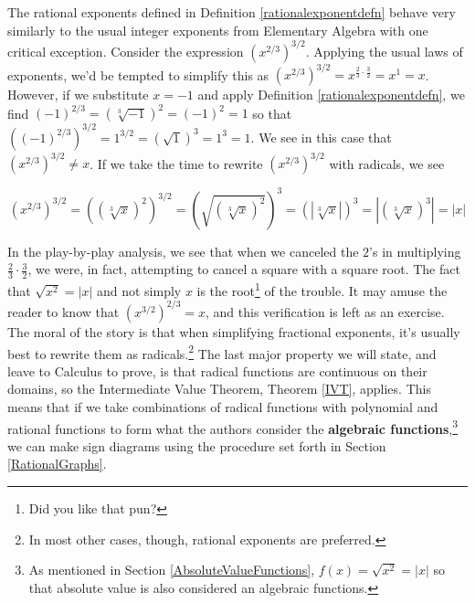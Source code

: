 \documentclass[12pt]{ximera}
\begin{document}

\smallskip

The rational exponents defined in Definition \ref{rationalexponentdefn} behave very similarly to the usual integer exponents from Elementary Algebra with one critical exception.  Consider the expression $\left(x^{2/3}\right)^{3/2}$.  Applying the usual laws of exponents, we'd be tempted to simplify this as $\left(x^{2/3}\right)^{3/2} = x^{\frac{2}{3} \cdot \frac{3}{2}} = x^{1} = x$.  However, if we substitute $x=-1$ and apply Definition \ref{rationalexponentdefn}, we find $(-1)^{2/3} = \left(\sqrt[3]{-1}\right)^2 = (-1)^2 = 1$ so that $\left((-1)^{2/3}\right)^{3/2} = 1^{3/2} = \left(\sqrt{1}\right)^3 = 1^3 = 1$.  We see in this case that $\left(x^{2/3}\right)^{3/2} \neq x$.  If we take the time to rewrite $\left(x^{2/3}\right)^{3/2}$ with radicals, we see 

\[ \left(x^{2/3}\right)^{3/2} = \left(\left(\sqrt[3]{x}\right)^2\right)^{3/2} =  \left(\sqrt{\left(\sqrt[3]{x}\right)^2}\right)^3 =\left(\left|\sqrt[3]{x}\right|\right)^3 = \left| \left(\sqrt[3]{x}\right)^3  \right| = |x|\]

In the play-by-play analysis, we see that when we canceled the $2$'s in multiplying $\frac{2}{3} \cdot \frac{3}{2}$, we were, in fact, attempting to cancel a square with a square root.  The fact that $\sqrt{x^2} = |x|$ and not simply $x$ is the root\footnote{Did you like that pun?} of the trouble.  It may amuse the reader to know that  $\left(x^{3/2}\right)^{2/3} = x$, and this verification is left as an exercise.  The moral of the story is that when simplifying fractional exponents, it's usually best to rewrite them as radicals.\footnote{In most other cases, though, rational exponents are preferred.}   The last major property we will state, and leave to Calculus to prove, is that radical functions are continuous on their domains, so the Intermediate Value Theorem, Theorem \ref{IVT}, applies.  This means that if we take combinations of radical functions with polynomial and rational functions to form what the authors consider  the \textbf{algebraic functions},\footnote{As mentioned in Section \ref{AbsoluteValueFunctions}, $f(x) = \sqrt{x^2}=|x|$ so that absolute value is also considered an algebraic functions.} we can make sign diagrams using the procedure set forth in Section \ref{RationalGraphs}.  

\medskip

\label{algebraicsigndiagram}

\end{document}
